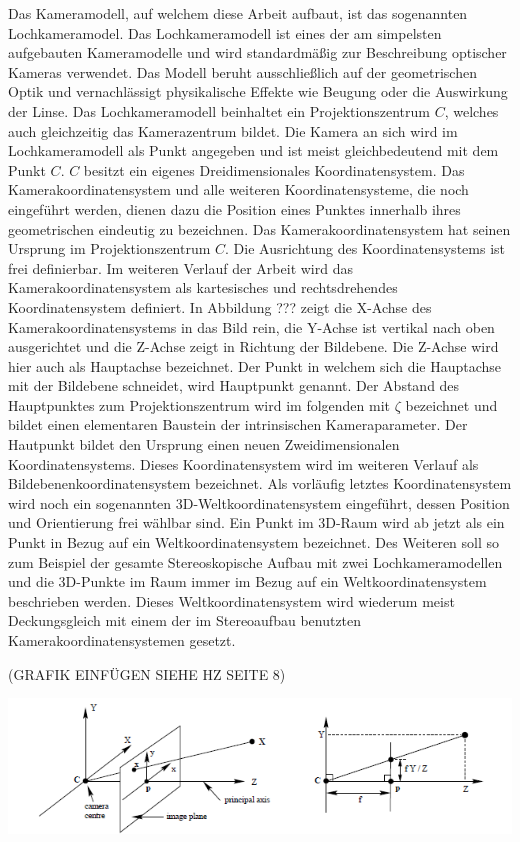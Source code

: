 Das Kameramodell, auf welchem diese Arbeit aufbaut, ist das sogenannten Lochkameramodel. Das Lochkameramodell ist eines der am simpelsten aufgebauten Kameramodelle und wird standardmäßig zur Beschreibung optischer Kameras verwendet. Das Modell beruht ausschließlich auf der geometrischen Optik und vernachlässigt physikalische Effekte wie Beugung oder die Auswirkung der Linse\cite{heipke}. Das Lochkameramodell beinhaltet ein Projektionszentrum $C$, welches auch gleichzeitig das Kamerazentrum bildet. Die Kamera an sich wird im Lochkameramodell als Punkt angegeben und ist meist gleichbedeutend mit dem Punkt $C$. $C$ besitzt ein eigenes Dreidimensionales Koordinatensystem. Das Kamerakoordinatensystem und alle weiteren Koordinatensysteme, die noch eingeführt werden, dienen dazu die Position eines Punktes innerhalb ihres geometrischen eindeutig zu bezeichnen. Das Kamerakoordinatensystem hat seinen Ursprung im Projektionszentrum $C$. Die Ausrichtung des Koordinatensystems ist frei definierbar. Im weiteren Verlauf der Arbeit wird das Kamerakoordinatensystem als kartesisches und rechtsdrehendes Koordinatensystem definiert. In Abbildung ??? zeigt die X-Achse des Kamerakoordinatensystems in das Bild rein, die Y-Achse ist vertikal nach oben ausgerichtet und die Z-Achse zeigt in Richtung der Bildebene. Die Z-Achse wird hier auch als Hauptachse bezeichnet. Der Punkt in welchem sich die Hauptachse mit der Bildebene schneidet, wird Hauptpunkt genannt. Der Abstand des Hauptpunktes zum Projektionszentrum wird im folgenden mit $\zeta$ bezeichnet und bildet einen elementaren Baustein der intrinsischen Kameraparameter. Der Hautpunkt bildet den Ursprung einen neuen Zweidimensionalen Koordinatensystems. Dieses Koordinatensystem wird im weiteren Verlauf als Bildebenenkoordinatensystem bezeichnet\cite{HZ}. Als vorläufig letztes Koordinatensystem wird noch ein sogenannten 3D-Weltkoordinatensystem eingeführt, dessen Position und Orientierung frei wählbar sind. Ein Punkt im 3D-Raum wird ab jetzt als ein Punkt in Bezug auf ein Weltkoordinatensystem bezeichnet. Des Weiteren soll so zum Beispiel der gesamte Stereoskopische Aufbau mit zwei Lochkameramodellen und die 3D-Punkte im Raum immer im Bezug auf ein Weltkoordinatensystem beschrieben werden. Dieses Weltkoordinatensystem wird wiederum meist Deckungsgleich mit einem der im Stereoaufbau benutzten Kamerakoordinatensystemen gesetzt.

(GRAFIK EINFÜGEN SIEHE HZ SEITE 8)

	\begin{minipage}{\linewidth}
	\centering
	\includegraphics[width=.8\linewidth]{images/pinhole HZ.png}
	\label{fig:PinholeCamera}
\end{minipage}\\ \\





